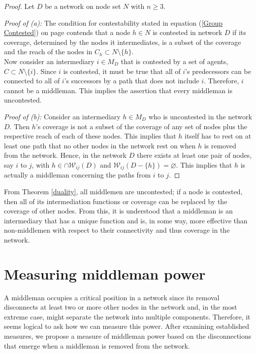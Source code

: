 \begin{proof}
Let $D$ be a network on node set $N$ with $n \geqslant 3$.

\smallskip\noindent
\emph{Proof of (a):}
The condition for contestability stated in equation (\ref{Group Contested}) on page \pageref{Group Contested} contends that a node $h \in N$ is contested in network $D$ if its coverage, determined by the nodes it intermediates, is a subset of the coverage and the reach of the nodes in $C_{h} \subset N \setminus \{ h \}$.
\\
Now consider an intermediary $i \in M_D$ that is contested by a set of agents, $C \subset N \setminus \{ i \}$. Since $i$ is contested, it must be true that all of $i$'s predecessors can be connected to all of $i$'s successors by a path that does not include $i$. Therefore, $i$ cannot be a middleman. This implies the assertion that every middleman is uncontested.

\smallskip\noindent
\emph{Proof of (b):}
Consider an intermediary $h \in M_D$ who is uncontested in the network $D$. Then $h$'s coverage is not a subset of the coverage of any set of nodes plus the respective reach of each of these nodes. This implies that $h$ itself has to rest on at least one path that no other nodes in the network rest on when $h$ is removed from the network. Hence, in the network $D$ there exists at least one pair of nodes, say $i$ to $j$, with $h \in \cap \mathcal{W}_{ij} (D)$ and $\mathcal{W}_{ij}(D - \{h\}) = \varnothing$. This implies that $h$ is actually a middleman concerning the paths from $i$ to $j$.
\end{proof}

\medskip\noindent
From Theorem \ref{duality}, all middlemen are uncontested; if a node is contested, then all of its intermediation functions or coverage can be replaced by the coverage of other nodes. From this, it is understood that a middleman is an intermediary that has a unique function and is, in some way, more effective than non-middlemen with respect to their connectivity and thus coverage in the network.

\section{Measuring middleman power}
\label{sec:middlemanPower}

A middleman occupies a critical position in a network since its removal disconnects at least two or more other nodes in the network and, in the most extreme case, might separate the network into multiple components. Therefore, it seems logical to ask how we can measure this power. After examining established measures, we propose a measure of middleman power based on the disconnections that emerge when a middleman is removed from the network.

